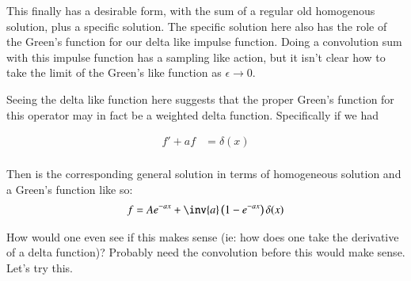 \documentclass{article}
\begin{document}
This finally has a desirable form, with the sum of a regular old homogenous solution, plus a specific solution.  The specific solution here also has the role of the Green's function for our delta like impulse function.  Doing a convolution sum with this impulse function has a sampling like action, but it isn't clear how to take the
limit of the Green's like function as $\epsilon \rightarrow 0$.

Seeing the delta like function here suggests that the proper Green's function for this operator may in fact be a weighted delta function.  Specifically if we had

\begin{align*}
f' + a f &= \delta(x) \\
\end{align*}

Then is the corresponding general solution in terms of homogeneous solution and a Green's function like so:
\begin{align*}
f &= A e^{-ax} + \inv{a} \left(1 - e^{-a x}\right) \delta(x) \\
\end{align*}

How would one even see if this makes sense (ie: how does one take the derivative of a delta function)?  Probably need the convolution before this would make sense.  Let's try this.



\end{document}
